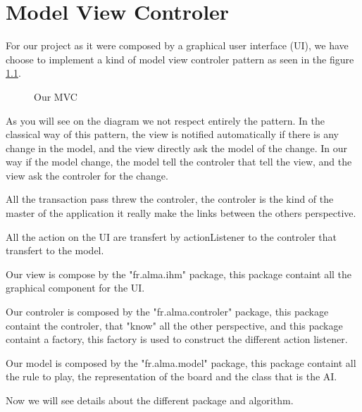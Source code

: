 \chapter{Model View Controler}

For our project as it were composed by a graphical user interface (UI), we have choose to implement a kind of model view controler pattern as seen in the figure \ref{mvc}.

  \begin{figure}[h!]
  \centering


  \caption{Our MVC}
\label{mvc} 
 \end{figure}

As you will see on the diagram we not respect entirely the pattern. In the classical way of this pattern, the view is notified automatically if there is any change in the model, and the view directly ask the model of the change. In our way if the model change, the model tell the controler that tell the view, and the view ask the controler for the change.

All the transaction pass threw the controler, the controler is the kind of the master of the application it really make the links between the others perspective. 

All the action on the UI are transfert by actionListener to the controler that transfert to the model.

Our view is compose by the "fr.alma.ihm" package, this package containt all the graphical component for the UI.

Our controler is composed by the "fr.alma.controler" package, this package containt the controler, that "know" all the other perspective, and this package containt a factory, this factory is used to construct the different action listener.

Our model is composed by the "fr.alma.model" package, this package containt all the rule to play, the representation of the board and the class that is the AI.

Now we will see details about the different package and algorithm.


\clearpage
